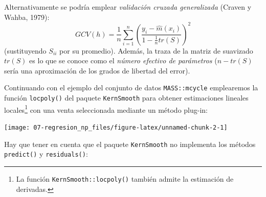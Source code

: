 \documentclass[
]{book}
\newenvironment{Shaded}{\begin{snugshade}}{\end{snugshade}}
\newcommand{\AttributeTok}[1]{\textcolor[rgb]{0.77,0.63,0.00}{#1}}
\newcommand{\CommentTok}[1]{\textcolor[rgb]{0.56,0.35,0.01}{\textit{#1}}}
\newcommand{\FunctionTok}[1]{\textcolor[rgb]{0.00,0.00,0.00}{#1}}
\newcommand{\NormalTok}[1]{#1}
\newcommand{\OtherTok}[1]{\textcolor[rgb]{0.56,0.35,0.01}{#1}}
\newcommand{\SpecialCharTok}[1]{\textcolor[rgb]{0.00,0.00,0.00}{#1}}
\newcommand{\StringTok}[1]{\textcolor[rgb]{0.31,0.60,0.02}{#1}}
\theoremstyle{break}
\theoremstyle{definition}
\theoremstyle{definition}
\theoremstyle{definition}
\theoremstyle{definition}
\theoremstyle{remark}
\begin{document}
Alternativamente se podría emplear \emph{validación cruzada generalizada} (Craven y Wahba, 1979):
\[GCV(h)=\frac{1}{n}\sum_{i=1}^n\left(\frac{y_i-\hat{m}(x_i)}{1 - \frac{1}{n}tr(S)}\right)^2\]
(sustituyendo \(S_{ii}\) por su promedio).
Además, la traza de la matriz de suavizado \(tr(S)\) es lo que se conoce como el \emph{número efectivo de parámetros} (\(n - tr(S)\) sería una aproximación de los grados de libertad del error).

Continuando con el ejemplo del conjunto de datos \texttt{MASS::mcycle} emplearemos la función \texttt{locpoly()} del paquete \texttt{KernSmooth} para obtener estimaciones lineales locales\footnote{La función \texttt{KernSmooth::locpoly()} también admite la estimación de derivadas.} con una venta seleccionada mediante un método plug-in:

\begin{Shaded}
\end{Shaded}

\begin{center}\texttt{[image: 07-regresion\_np\_files/figure-latex/unnamed-chunk-2-1]} \end{center}

Hay que tener en cuenta que el paquete \texttt{KernSmooth} no implementa los métodos
\texttt{predict()} y \texttt{residuals()}:

\begin{Shaded}
\end{Shaded}
\end{document}
